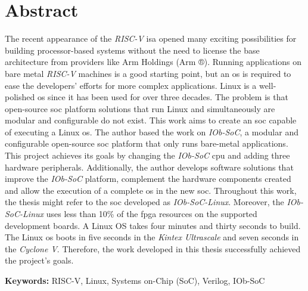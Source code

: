 \cleardoubleoddpage

\chapter*{Abstract}
\thispagestyle{empty} %
The recent appearance of the \textit{RISC-V} \acrshort{isa} opened many exciting possibilities for building processor-based systems without the need to license the base architecture from providers like Arm Holdings (Arm ®). Running applications on bare metal \textit{RISC-V} machines is a good starting point, but an \acrshort{os} is required to ease the developers' efforts for more complex applications. Linux is a well-polished \acrshort{os} since it has been used for over three decades. The problem is that open-source \acrshort{soc} platform solutions that run Linux and simultaneously are modular and configurable do not exist.
This work aims to create an \acrshort{soc} capable of executing a Linux \acrshort{os}. The author based the work on \textit{IOb-SoC}, a modular and configurable open-source \acrshort{soc} platform that only runs bare-metal applications. This project achieves its goals by changing the \textit{IOb-SoC} \acrshort{cpu} and adding three hardware peripherals. Additionally, the author develops software solutions that improve the \textit{IOb-SoC} platform, complement the hardware components created and allow the execution of a complete \acrshort{os} in the new \acrshort{soc}. Throughout this work, the thesis might refer to the \acrshort{soc} developed as \textit{IOb-SoC-Linux}.
Moreover, the \textit{IOb-SoC-Linux} uses less than 10\% of the \acrshort{fpga} resources on the supported development boards. A Linux OS takes four minutes and thirty seconds to build. The Linux \acrshort{os} boots in five seconds in the \textit{Kintex Ultrascale} and seven seconds in the \textit{Cyclone V}. Therefore, the work developed in this thesis successfully achieved the project's goals.


\vfill

\textbf{\Large Keywords:} RISC-V, Linux, Systems on-Chip (SoC), Verilog, IOb-SoC